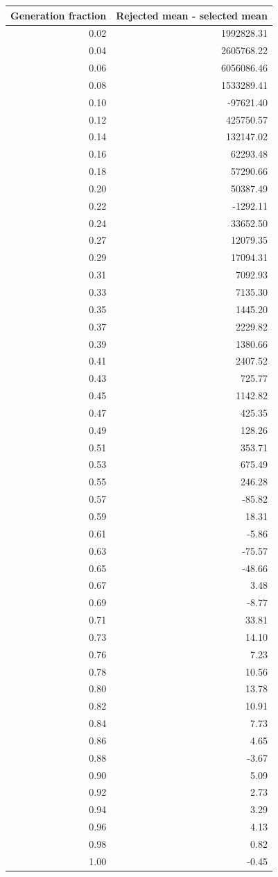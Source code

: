 \begin{tabular}{rr}
\toprule
Generation fraction & Rejected mean - selected mean \\
\midrule
0.02 & 1992828.31 \\
0.04 & 2605768.22 \\
0.06 & 6056086.46 \\
0.08 & 1533289.41 \\
0.10 & -97621.40 \\
0.12 & 425750.57 \\
0.14 & 132147.02 \\
0.16 & 62293.48 \\
0.18 & 57290.66 \\
0.20 & 50387.49 \\
0.22 & -1292.11 \\
0.24 & 33652.50 \\
0.27 & 12079.35 \\
0.29 & 17094.31 \\
0.31 & 7092.93 \\
0.33 & 7135.30 \\
0.35 & 1445.20 \\
0.37 & 2229.82 \\
0.39 & 1380.66 \\
0.41 & 2407.52 \\
0.43 & 725.77 \\
0.45 & 1142.82 \\
0.47 & 425.35 \\
0.49 & 128.26 \\
0.51 & 353.71 \\
0.53 & 675.49 \\
0.55 & 246.28 \\
0.57 & -85.82 \\
0.59 & 18.31 \\
0.61 & -5.86 \\
0.63 & -75.57 \\
0.65 & -48.66 \\
0.67 & 3.48 \\
0.69 & -8.77 \\
0.71 & 33.81 \\
0.73 & 14.10 \\
0.76 & 7.23 \\
0.78 & 10.56 \\
0.80 & 13.78 \\
0.82 & 10.91 \\
0.84 & 7.73 \\
0.86 & 4.65 \\
0.88 & -3.67 \\
0.90 & 5.09 \\
0.92 & 2.73 \\
0.94 & 3.29 \\
0.96 & 4.13 \\
0.98 & 0.82 \\
1.00 & -0.45 \\
\bottomrule
\end{tabular}
